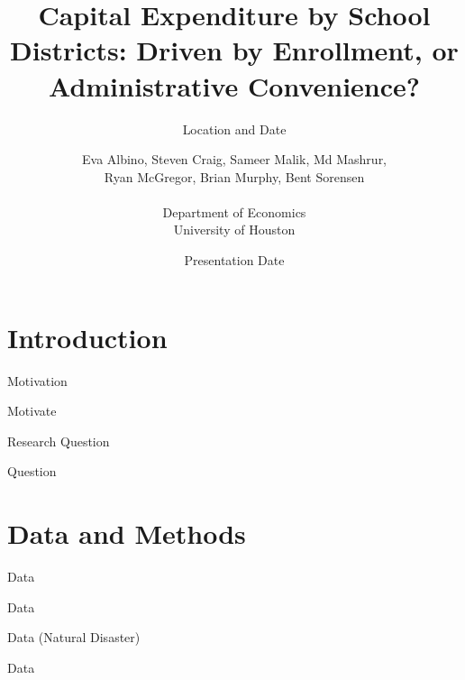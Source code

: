 \documentclass[aspectratio=169]{beamer}
\title[School Capital]{Capital Expenditure by School Districts:
Driven by Enrollment, or Administrative Convenience?}
\subtitle{Location and Date}
\author{Eva Albino, Steven Craig, Sameer Malik, Md Mashrur, \\
Ryan McGregor, Brian Murphy, Bent Sorensen \\ \\
Department of Economics \\
University of Houston \\ 
}
\date{Presentation Date}
\begin{document}
\maketitle






\section{Introduction}

\begin{frame}{Motivation}

Motivate

\end{frame}


\begin{frame}{Research Question}

Question

\end{frame}


\section{Data and Methods}

\begin{frame}{Data}

Data

\end{frame}

\begin{frame}{Data (Natural Disaster)}

Data

\end{frame}
\end{document}
